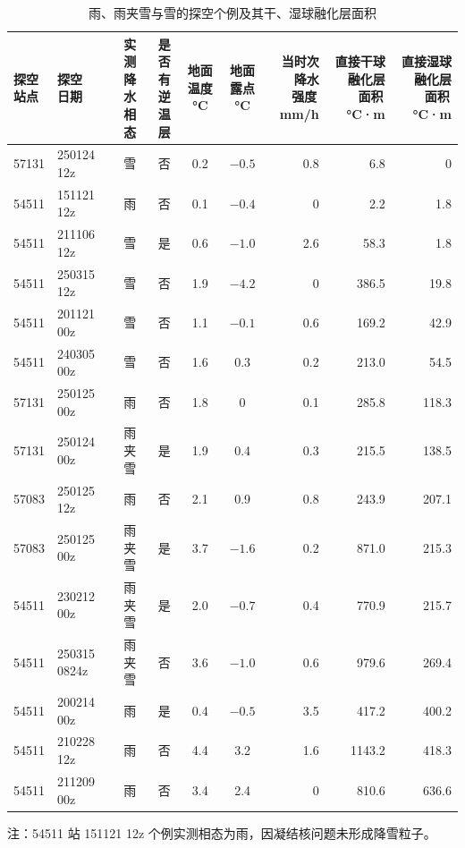 \begin{table}[htbp]
  \centering
  \caption{雨、雨夹雪与雪的探空个例及其干、湿球融化层面积}
  \label{tab:rain}
  \footnotesize
  \setlength{\tabcolsep}{3.5pt}
  \begin{tabular}{@{}llccccrrr@{}}
    \toprule
    \shortstack{探空\\站点} & \shortstack{探空\\日期} & \shortstack{实测降水\\相态} & \shortstack{是否有\\逆温层}
      & \shortstack{地面温度\\°C} & \shortstack{地面露点\\°C} & \shortstack{当时次降水\\强度\,mm/h}
      & \shortstack{直接干球融化层\\面积\,°C·m} & \shortstack{直接湿球融化层\\面积\,°C·m} \\
    \midrule
    57131 & 250124 12z   & 雪     & 否 & 0.2 & $-0.5$ & 0.8 & 6.8    & 0     \\
    54511 & 151121 12z   & 雨     & 否 & 0.1 & $-0.4$ & 0   & 2.2    & 1.8   \\
    54511 & 211106 12z   & 雪     & 是 & 0.6 & $-1.0$ & 2.6 & 58.3   & 1.8   \\
    54511 & 250315 12z   & 雪     & 否 & 1.9 & $-4.2$ & 0   & 386.5  & 19.8  \\
    54511 & 201121 00z   & 雪     & 否 & 1.1 & $-0.1$ & 0.6 & 169.2  & 42.9  \\
    54511 & 240305 00z   & 雪     & 否 & 1.6 & 0.3    & 0.2 & 213.0  & 54.5  \\
    57131 & 250125 00z   & 雨     & 否 & 1.8 & 0      & 0.1 & 285.8  & 118.3 \\
    57131 & 250124 00z   & 雨夹雪 & 是 & 1.9 & 0.4    & 0.3 & 215.5  & 138.5 \\
    57083 & 250125 12z   & 雨     & 否 & 2.1 & 0.9    & 0.8 & 243.9  & 207.1 \\
    57083 & 250125 00z   & 雨夹雪 & 是 & 3.7 & $-1.6$ & 0.2 & 871.0  & 215.3 \\
    54511 & 230212 00z   & 雨夹雪 & 是 & 2.0 & $-0.7$ & 0.4 & 770.9  & 215.7 \\
    54511 & 250315 0824z & 雨夹雪 & 否 & 3.6 & $-1.0$ & 0.6 & 979.6  & 269.4 \\
    54511 & 200214 00z   & 雨     & 是 & 0.4 & $-0.5$ & 3.5 & 417.2  & 400.2 \\
    54511 & 210228 12z   & 雨     & 否 & 4.4 & 3.2    & 1.6 & 1143.2 & 418.3 \\
    54511 & 211209 00z   & 雨     & 否 & 3.4 & 2.4    & 0   & 810.6  & 636.6 \\
    \bottomrule
  \end{tabular}

  \par\smallskip
  {\footnotesize 注：54511 站 151121 12z 个例实测相态为雨，因凝结核问题未形成降雪粒子。}
\end{table}

